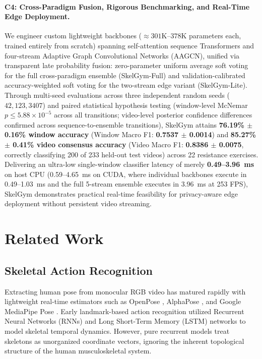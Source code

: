 \documentclass[runningheads]{llncs}
\begin{document}
\paragraph{C4: Cross-Paradigm Fusion, Rigorous Benchmarking, and Real-Time Edge Deployment.} We engineer custom lightweight backbones ($\approx 301\text{K}$--$378\text{K}$ parameters each, trained entirely from scratch) spanning self-attention sequence Transformers and four-stream Adaptive Graph Convolutional Networks (AAGCN), unified via transparent late probability fusion: zero-parameter uniform average soft voting for the full cross-paradigm ensemble (SkelGym-Full) and validation-calibrated accuracy-weighted soft voting for the two-stream edge variant (SkelGym-Lite). Through multi-seed evaluations across three independent random seeds ($42, 123, 3407$) and paired statistical hypothesis testing (window-level McNemar $p \le 5.88 \times 10^{-5}$ across all transitions; video-level posterior confidence differences confirmed across sequence-to-ensemble transitions), SkelGym attains \textbf{76.19\% $\pm$ 0.16\% window accuracy} (Window Macro F1: \textbf{0.7537 $\pm$ 0.0014}) and \textbf{85.27\% $\pm$ 0.41\% video consensus accuracy} (Video Macro F1: \textbf{0.8386 $\pm$ 0.0075}, correctly classifying 200 of 233 held-out test videos) across 22 resistance exercises. Delivering an ultra-low single-window classifier latency of merely \textbf{0.49--3.96~ms} on host CPU (0.59--4.65~ms on CUDA, where individual backbones execute in 0.49--1.03~ms and the full 5-stream ensemble executes in 3.96~ms at 253 FPS), SkelGym demonstrates practical real-time feasibility for privacy-aware edge deployment without persistent video streaming.

\section{Related Work}

\subsection{Skeletal Action Recognition}
Extracting human pose from monocular RGB video has matured rapidly with lightweight real-time estimators such as OpenPose \cite{cao2019}, AlphaPose \cite{fang2022}, and Google MediaPipe Pose \cite{chuankun2019,bazarevsky2020}. Early landmark-based action recognition utilized Recurrent Neural Networks (RNNs) and Long Short-Term Memory (LSTM) networks \cite{hochreiter1997long,graves2005,li2017} to model skeletal temporal dynamics. However, pure recurrent models treat skeletons as unorganized coordinate vectors, ignoring the inherent topological structure of the human musculoskeletal system.
\end{document}
